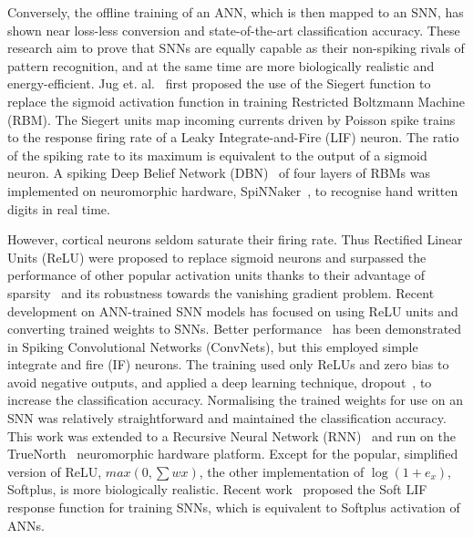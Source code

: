 
Conversely, the offline training of an ANN, which is then mapped to an SNN, has shown near loss-less conversion and state-of-the-art classification accuracy.
These research aim to prove that SNNs are equally capable as their non-spiking rivals of pattern recognition, and at the same time are more biologically realistic and energy-efficient.
Jug et. al.~\cite{Jug_etal_2012} first proposed the use of the Siegert function to replace the sigmoid activation function in training Restricted Boltzmann Machine (RBM).
The Siegert units map incoming currents driven by Poisson spike trains to the response firing rate of a Leaky Integrate-and-Fire (LIF) neuron.
The ratio of the spiking rate to its maximum is equivalent to the output of a sigmoid neuron.
A spiking Deep Belief Network (DBN)~\cite{Stromatias2015scalable} of four layers of RBMs was implemented on neuromorphic hardware, SpiNNaker~\cite{furber2014spinnaker}, to recognise hand written digits in real time.

However, cortical neurons seldom saturate their firing rate.
Thus Rectified Linear Units (ReLU) were proposed to replace sigmoid neurons and surpassed the performance of other popular activation units thanks to their advantage of sparsity~\cite{glorot2011deep} and its robustness towards the vanishing gradient problem. %
Recent development on ANN-trained SNN models has focused on using ReLU units and converting trained weights to SNNs.
Better performance~\cite{cao2015spiking,diehl2015fast} has been demonstrated in Spiking Convolutional Networks (ConvNets), but this employed simple integrate and fire (IF) neurons.
The training used only ReLUs and zero bias to avoid negative outputs, and applied a deep learning technique, dropout~\cite{srivastava2014dropout}, to increase the classification accuracy.
Normalising the trained weights for use on an SNN was relatively straightforward and maintained the classification accuracy.
This work was extended to a Recursive Neural Network (RNN)~\cite{diehl2016conversion} and run on the TrueNorth~\cite{merolla2014million} neuromorphic hardware platform.
Except for the popular, simplified version of ReLU, $max(0,\sum w x)$, the other implementation of $\log(1+e_x)$, Softplus, is more biologically realistic.
Recent work~\cite{hunsberger2015spiking} proposed the Soft LIF response function for training SNNs, which is equivalent to Softplus activation of ANNs.
	
